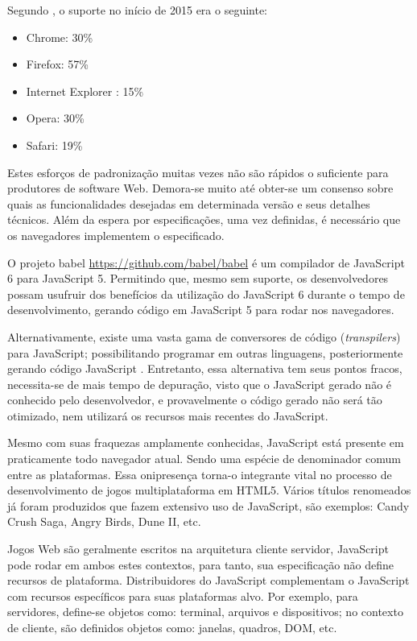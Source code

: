 Segundo \citet{ecmaSupport}, o suporte no início de 2015 era o seguinte:

\begin{itemize}
    \item Chrome: 30\%
    \item Firefox: 57\%
    \item Internet Explorer : 15\%
    \item Opera: 30\%
    \item Safari: 19\%
\end{itemize}

Estes esforços de padronização muitas vezes não são rápidos
o suficiente para produtores de software Web. Demora-se muito até
obter-se um consenso sobre quais as funcionalidades desejadas em
determinada versão e seus detalhes técnicos. Além da
espera por especificações, uma vez definidas, é necessário que os
navegadores implementem o especificado.

O projeto babel \url{https://github.com/babel/babel} é um compilador de
JavaScript 6 para JavaScript 5. Permitindo que, mesmo sem suporte, os
desenvolvedores possam usufruir dos benefícios da utilização do
JavaScript 6 durante o tempo de desenvolvimento, gerando código em
JavaScript 5 para rodar nos navegadores.

Alternativamente, existe uma vasta gama de conversores de código
(\textit{transpilers}) para JavaScript; possibilitando programar
em outras linguagens, posteriormente gerando código JavaScript .
Entretanto, essa alternativa tem seus pontos fracos, necessita-se
de mais tempo de depuração, visto que o JavaScript gerado não é
conhecido pelo desenvolvedor, e provavelmente o código gerado não
será tão otimizado, nem utilizará os recursos mais recentes do
JavaScript.

Mesmo com suas fraquezas amplamente conhecidas, JavaScript está
presente em praticamente todo navegador atual. Sendo uma espécie de
denominador comum entre as plataformas. Essa onipresença torna-o
integrante vital no processo de desenvolvimento de jogos multiplataforma
em HTML5. Vários títulos renomeados já foram produzidos que fazem
extensivo uso de JavaScript, são exemplos: Candy Crush Saga, Angry
Birds, Dune II, etc.

Jogos Web são geralmente escritos na arquitetura cliente servidor,
JavaScript pode rodar em ambos estes contextos, para tanto, sua
especificação não define recursos de plataforma. Distribuidores do
JavaScript complementam o JavaScript com recursos específicos para
suas plataformas alvo. Por exemplo, para servidores, define-se objetos como:
terminal, arquivos e dispositivos; no contexto de cliente,
são definidos objetos como: janelas, quadros, DOM, etc.

